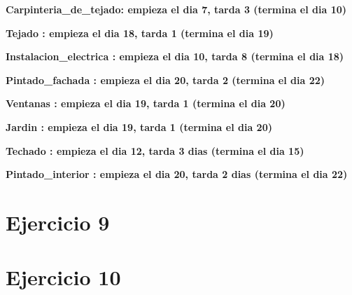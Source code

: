 \documentclass[11pt,a4paper]{article}
\begin{document}
\textbf{Carpinteria\_de\_tejado: empieza el dia 7, tarda 3 (termina el dia 10)}\vspace{-8px}

\textbf{Tejado : empieza el dia 18, tarda 1 (termina el dia 19)} \vspace{-8px}

\textbf{Instalacion\_electrica : empieza el dia 10, tarda 8 (termina el dia 18)}\vspace{-8px}

\textbf{Pintado\_fachada : empieza el dia 20, tarda 2 (termina el dia 22)} \vspace{-8px}

\textbf{Ventanas : empieza el dia 19, tarda 1 (termina el dia 20)} \vspace{-8px}

\textbf{Jardin : empieza el dia 19, tarda 1 (termina el dia 20)} \vspace{-8px}

\textbf{Techado : empieza el dia 12, tarda 3 dias (termina el dia 15)} \vspace{-8px}

\textbf{Pintado\_interior : empieza el dia 20, tarda 2 dias (termina el dia 22)} \vspace{-8px}



\section*{Ejercicio 9}



\section*{Ejercicio 10}
\end{document}
